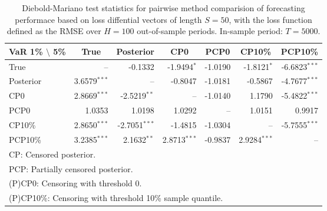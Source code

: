 { \renewcommand{\arraystretch}{1.2} 
\begin{table}[!ht] 
\center 
\begin{tabular}{l | rrr rrr} 
VaR 1\% $\setminus$ 5\% & \multicolumn{1}{c}{True} & \multicolumn{1}{c}{Posterior} & \multicolumn{1}{c}{CP0} & \multicolumn{1}{c}{PCP0} & \multicolumn{1}{c}{CP10\%} & \multicolumn{1}{c}{PCP10\%} \\ \hline 
True &    --\phantom{$^{***}$} & -0.1332\phantom{$^{***}$} & -1.9494$^{*}$\phantom{$^{**}$} & -1.0190\phantom{$^{***}$} & -1.8121$^{*}$\phantom{$^{**}$} & -6.6823$^{***}$  \\ 
Posterior & 3.6579$^{***}$ &    --\phantom{$^{***}$} & -0.8047\phantom{$^{***}$} & -1.0181\phantom{$^{***}$} & -0.5867\phantom{$^{***}$} & -4.7677$^{***}$  \\ 
CP0 & 2.8669$^{***}$ & -2.5219$^{**}$\phantom{$^{*}$} &    --\phantom{$^{***}$} & -1.0140\phantom{$^{***}$} & 1.1790\phantom{$^{***}$} & -5.4822$^{***}$  \\ 
PCP0 & 1.0353\phantom{$^{***}$} & 1.0198\phantom{$^{***}$} & 1.0292\phantom{$^{***}$} &    --\phantom{$^{***}$} & 1.0151\phantom{$^{***}$} & 0.9917\phantom{$^{***}$}  \\ 
CP10\% & 2.8650$^{***}$ & -2.7051$^{***}$ & -1.4815\phantom{$^{***}$} & -1.0304\phantom{$^{***}$} &    --\phantom{$^{***}$} & -5.7555$^{***}$  \\ 
PCP10\% & 3.2385$^{***}$ & 2.1632$^{**}$\phantom{$^{*}$} & 2.8713$^{***}$ & -0.9837\phantom{$^{***}$} & 2.9284$^{***}$ &    --\phantom{$^{***}$}  \\ 
\hline 
\multicolumn{7}{l}{\footnotesize{CP: Censored posterior.}}  \\ 
\multicolumn{7}{l}{\footnotesize{PCP: Partially censored posterior.}} \\ 
\multicolumn{7}{l}{\footnotesize{(P)CP0: Censoring with threshold 0.}} \\ 
\multicolumn{7}{l}{\footnotesize{(P)CP10\%: Censoring with threshold 10\% sample quantile.}}  \\ 
\end{tabular}
 \caption{Diebold-Mariano test statistics for  pairwise method comparision of forecasting performace based on loss diffential vectors of length $S = 50$, with the loss function defined as the RMSE over $H=100$ out-of-sample periods. In-sample period: $T = 5000$.} 
\label{tab:garch11_DM_T_5000}  
\end{table}
}